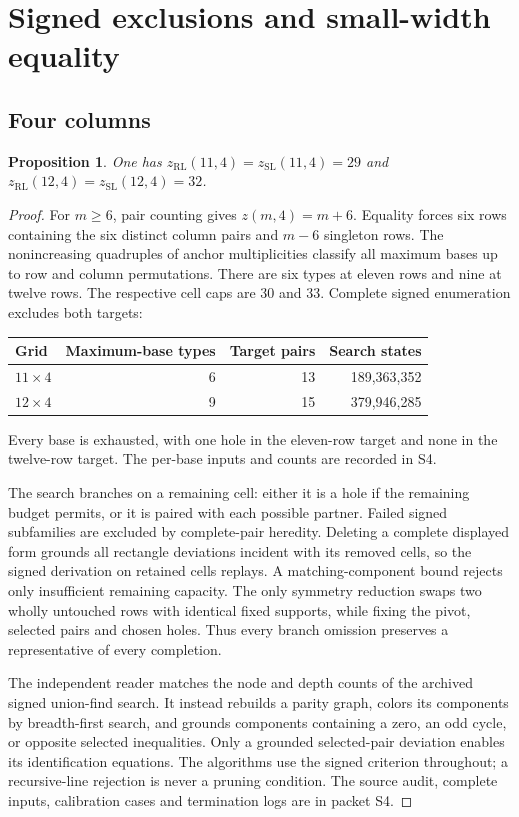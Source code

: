 \documentclass[11pt,a4paper]{article}
\newtheorem{proposition}[theorem]{Proposition}
\theoremstyle{definition}
\newcommand{\zr}{z_{\mathrm{RL}}}
\newcommand{\zs}{z_{\mathrm{SL}}}
\begin{document}
\section{Signed exclusions and small-width equality}\label{sec:signed-small}
\subsection{Four columns}
\begin{proposition}\label{prop:four-signed}
One has $\zr(11,4)=\zs(11,4)=29$ and $\zr(12,4)=\zs(12,4)=32$.
\end{proposition}
\begin{proof}
For $m\ge6$, pair counting gives $z(m,4)=m+6$. Equality forces six
rows containing the six distinct column pairs and $m-6$ singleton rows.
The nonincreasing quadruples of anchor multiplicities classify all maximum
bases up to row and column permutations. There are six types at eleven
rows and nine at twelve rows. The respective cell caps are 30 and 33.
Complete signed enumeration excludes both targets:
\begin{center}
\begin{tabular}{lrrr}
\toprule
Grid&Maximum-base types&Target pairs&Search states\\
\midrule
$11\times4$&6&13&189,363,352\\
$12\times4$&9&15&379,946,285\\
\bottomrule
\end{tabular}
\end{center}
Every base is exhausted, with one hole in the eleven-row target and none
in the twelve-row target. The per-base inputs and counts are recorded in S4.

The search branches on a remaining
cell: either it is a hole if the remaining budget permits, or it is paired
with each possible partner. Failed signed subfamilies are excluded by complete-pair heredity.
Deleting a complete displayed form grounds all rectangle deviations incident
with its removed cells, so the signed derivation on retained cells replays.
A matching-component bound rejects only insufficient remaining capacity.
The only symmetry reduction swaps two wholly untouched rows with identical
fixed supports, while fixing the pivot, selected pairs and chosen holes.
Thus every branch omission preserves a representative of every completion.

The independent reader matches the node and depth counts of the archived
signed union-find search. It instead
rebuilds a parity graph, colors its components by breadth-first search,
and grounds components containing a zero, an odd cycle, or opposite selected
inequalities. Only a grounded selected-pair deviation enables its
identification equations. The algorithms use the signed criterion throughout;
a recursive-line rejection is never a pruning condition. The source audit,
complete inputs, calibration cases and termination logs are in packet S4.


\end{proof}
\end{document}
